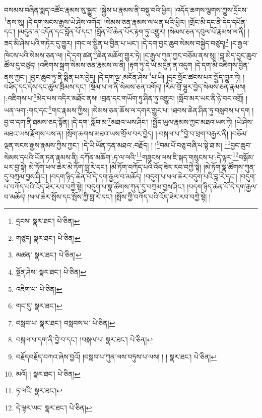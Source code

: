 བསམས་བཞིན་སྨད་འཚོང་རྣམས་སུ་སྒྱུར། །སྐྱེས་པ་རྣམས་ནི་བསྡུ་བའི་ཕྱིར། །འདོད་ཆགས་ལྕགས་ཀྱུས་དྲོངས་\footnote{དྲངས་  སྣར་ཐང་།  པེ་ཅིན། }ནས་སུ། །དེ་དག་སངས་རྒྱས་ཡེ་ཤེས་འགོད། །སེམས་ཅན་རྣམས་ལ་ཕན་པའི་ཕྱིར། །གྲོང་མི་དང་ནི་དེད་དཔོན་དང་། །མདུན་ན་འདོན་དང་བློན་པོ་དང་། །བློན་པོ་ཆེན་པོར་རྟག་ཏུ་འགྱུར། །སེམས་ཅན་དབུལ་པོ་རྣམས་ལ་ནི། །ཟད་མི་ཤེས་པའི་གཏེར་དུ་གྱུར། །གང་ལ་སྦྱིན་པ་བྱིན་པ་ཡང་། །དེ་དག་བྱང་ཆུབ་སེམས་བསྐྱེད་བཙུད།\footnote{གཙུད།  སྣར་ཐང་།  པེ་ཅིན། } །ང་རྒྱལ་ཁེངས་པའི་སེམས་ཅན་ལ། །དེ་དག་ཚན་\footnote{མཚན་  སྣར་ཐང་།  པེ་ཅིན། }ཆེན་མཆོག་གྱུར་ཏེ། །ང་རྒྱལ་ཀུན་ཀྱང་བཅོམ་ནས་སུ། །བླ་མེད་བྱང་ཆུབ་ཚོལ་དུ་བཙུད། །འཇིགས་སྐྲག་སེམས་ཅན་རྣམས་ལ་ནི། །རྟག་ཏུ་དེ་ཡི་མདུན་ན་འདུག །དེ་དག་མི་འཇིགས་བྱིན་ནས་ཀྱང་། །བྱང་ཆུབ་ཏུ་ནི་སྨིན་པར་བྱེད། །དེ་དག་ལྔ་:མངོན་ཤེས་\footnote{སྔོན་ཤེས་  སྣར་ཐང་།  པེ་ཅིན། }པ་ཡི། །དྲང་སྲོང་ཚངས་པར་སྤྱོད་གྱུར་ཏེ། །བཟོད་དང་དེས་དང་ཚུལ་ཁྲིམས་དང་། །སྡོམ་པ་ལ་ནི་སེམས་ཅན་འགོད། །རིམ་གྲོ་ལྷུར་བྱེད་སེམས་ཅན་རྣམས། །:འཇིགས་པ་\footnote{འཇིག་པ་  པེ་ཅིན། }མེད་པས་འདིར་མཐོང་ནས། །བྲན་དང་གཡོག་ཏུ་ཤིན་ཏུ་འགྱུར། །སློབ་མར་ཡང་ནི་ཉེ་བར་འགྲོ། །ཡན་ལག་:གང་དང་\footnote{གང་དུ་  སྣར་ཐང་། }གང་རྣམས་ཀྱིས། །སེམས་ཅན་ཆོས་ལ་དགར་གྱུར་པ། །ཐབས་ཆེན་ཤིན་ཏུ་བསླབས་པ་དག །བྱ་བ་དག་ནི་ཐམས་ཅད་སྟོན། །དེ་དག་:སློབ་མ་\footnote{བསླབ་པ་  སྣར་ཐང་། བསླབས་པ་  པེ་ཅིན། }མཐའ་ཡས་ཤིང་། །སྤྱོད་ཡུལ་རྣམས་ཀྱང་མཐའ་ཡས་ཏེ། །ཡེ་ཤེས་མཐའ་ཡས་རྫོགས་པས་ན། །སྲོག་ཆགས་མཐའ་ཡས་གྲོལ་བར་བྱེད། །:བསྐལ་པ་\footnote{བསྐལ་པ་དག་ནི་བྱེ་བ་དང་། །བསྐལ་པ་  སྣར་ཐང་།  པེ་ཅིན། }བྱེ་བ་ཕྲག་བརྒྱར་ནི། །བཅོམ་ལྡན་སངས་རྒྱས་རྣམས་ཀྱིས་ཀྱང་། །དེ་ཡི་ཡོན་ཏན་མཐའ་:བརྗོད། ། །\footnote{བརྗོདབརྗོད་བཀའ་ཞེས་བྱའོ། །བསླབ་པ་ཀུན་ལས་བཏུས་པ་ལས། ། །  སྣར་ཐང་།  པེ་ཅིན། }བམ་པོ་བཅུ་བཞི་པ་སྟེ་ཐ་མ། \footnote{མའོ། །   སྣར་ཐང་།  པེ་ཅིན། }བྱང་ཆུབ་སེམས་དཔའི་ཡོན་ཏན་རྣམས་ནི། དཀོན་མཆོག་:ཏ་ལ་ལའི་\footnote{ཏ་ལའི་  སྣར་ཐང་། }གཟུངས་ལས་ཇི་སྐད་གསུངས་པ་:དེ་ལྟར་\footnote{དེ་ལྟར་ཡང་  སྣར་ཐང་།  པེ་ཅིན། }བསྒོམ་པར་བྱ་སྟེ། མེ་ཏོག་ཕལ་ཆེར་མེ་ཏོག་བླ་རེ་དང་། །མེ་ཏོག་བཀོད་པའི་འོད་ཟེར་རབ་བཀྱེ་སྟེ། །མེ་ཏོག་སྣ་ཚོགས་ཀུན་དུ་བཀྲམ་བྱས་ཤིང་། །བདག་ཉིད་ཆེན་པོ་དེ་དག་རྒྱལ་བ་མཆོད། །བདུག་པ་ཕལ་ཆེར་བདུག་པའི་བླ་རེ་དང་། །བདུག་པ་བཀོད་པའི་འོད་ཟེར་རབ་བཀྱེ་སྟེ། །བདུག་པ་སྣ་ཚོགས་ཀུན་དུ་བཀྲམ་བྱས་ཤིང་། །བདག་ཉིད་ཆེན་པོ་དེ་དག་རྒྱལ་བ་མཆོད། །ཕལ་ཆེར་སྤོས་དང་སྤོས་ཀྱི་བླ་རེ་དང་། །སྤོས་ཀྱི་བཀོད་པའི་འོད་ཟེར་རབ་བཀྱེ་སྟེ། །

